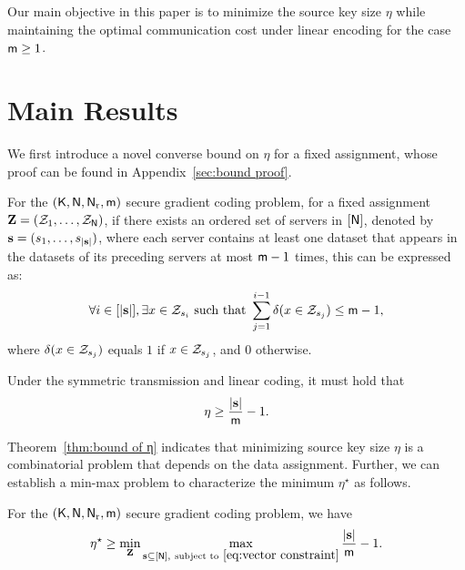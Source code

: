 \documentclass[conference,letterpaper]{IEEEtran}
\begin{document}
Our main objective in this paper is to minimize the source key size $\eta$ while maintaining the optimal communication cost under linear encoding for the case $ {\sf m} \geq 1$.







\section{Main Results}
\label{sec:main}
We first introduce a novel converse bound on $ \eta $ for a fixed assignment, whose proof can be found in Appendix~\ref{sec:bound proof}.
\begin{thm}
\label{thm:bound of η}
For the $({\sf K},{\sf N},{\sf N}_{\rm r}, {\sf m})$ secure gradient coding problem, for a fixed assignment \(\mathbf{Z} = ({\cal Z}_1, \ldots, {\cal Z}_{{\sf N}})\), if there exists an ordered set of servers in \([{\sf N}]\), denoted by \({\bf s} = (s_1, \ldots, s_{|{\bf s}|})\), where each server contains at least one dataset that appears in the datasets of its preceding servers at most \({\sf m} - 1\) times, this can be expressed as:
\begin{align}
\forall i \in [|{\bf s}|], \exists x \in {\cal Z}_{s_i} \text{ such that } \sum_{j=1}^{i-1} \delta(x \in {\cal Z}_{s_j}) \leq {\sf m} - 1, \label{eq:vector constraint}
\end{align}
where \(\delta(x \in {\cal Z}_{s_j})\) equals \(1\) if \(x \in {\cal Z}_{s_j}\), and \(0\) otherwise.

Under the symmetric transmission and linear coding, it must hold that
\begin{align}
\eta \geq \frac{|{\bf s}|}{{\sf m}}-1. \label{eq:converse lemma}
\end{align}
\end{thm}
Theorem~\ref{thm:bound of η} indicates that minimizing source key size $\eta$ is a combinatorial problem that depends on the data assignment. 
Further, we can establish a min-max problem to characterize the minimum $\eta^{\star}$ as follows.
\begin{cor}
    For the $({\sf K},{\sf N},{\sf N}_{\rm r}, {\sf m})$ secure gradient coding problem, we have
    \begin{align}
\eta^{\star} \geq \min_{\mathbf{Z}}
\max_{{\bf s} \subseteq [{\sf N}], ~\text{subject to}~ \eqref{eq:vector constraint} } \frac{|{\bf s}|}{{\sf m}}-1. \label{eq:converse lemma}
\end{align}
\end{cor}
\end{document}
